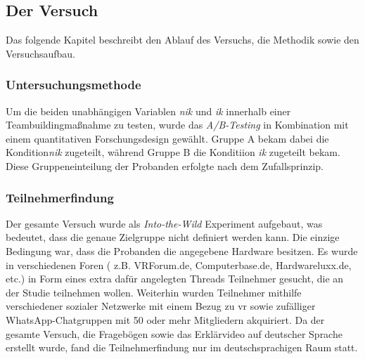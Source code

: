 \documentclass[a4paper,11pt]{article}%
\renewcommand{\\}{\vspace*{0.5\baselineskip} \newline}
\begin{document}
\subsection{Der Versuch}
	
Das folgende Kapitel beschreibt den Ablauf des Versuchs, die Methodik sowie den Versuchsaufbau.

\subsubsection{Untersuchungsmethode}
Um die beiden unabhängigen Variablen \textit{\ac{nik}} und \textit{\ac{ik}} innerhalb einer Teambuildingmaßnahme zu testen, wurde das \textit{A/B-Testing} in Kombination mit einem quantitativen Forschungsdesign gewählt.
Gruppe A bekam dabei die Kondition\textit{\ac{nik}} zugeteilt, während Gruppe B die Konditiion \textit{\ac{ik}} zugeteilt bekam. Diese Gruppeneinteilung der Probanden erfolgte nach dem Zufallsprinzip. 

	\subsubsection{Teilnehmerfindung}
Der gesamte Versuch wurde als \textit{Into-the-Wild} Experiment aufgebaut, was bedeutet, dass die genaue Zielgruppe nicht definiert werden kann. Die einzige Bedingung war, dass die Probanden die angegebene Hardware besitzen. Es wurde in verschiedenen Foren ( z.B. VRForum.de, Computerbase.de, Hardwareluxx.de, etc.) in Form eines extra dafür angelegten Threads Teilnehmer gesucht, die an der Studie teilnehmen wollen. Weiterhin wurden Teilnehmer mithilfe verschiedener sozialer Netzwerke mit einem Bezug zu \ac{vr} sowie zufälliger WhatsApp-Chatgruppen mit 50 oder mehr Mitgliedern akquiriert. Da der gesamte Versuch, die Fragebögen sowie das Erklärvideo auf deutscher Sprache erstellt wurde, fand die Teilnehmerfindung nur im deutschsprachigen Raum statt.
\end{document}

